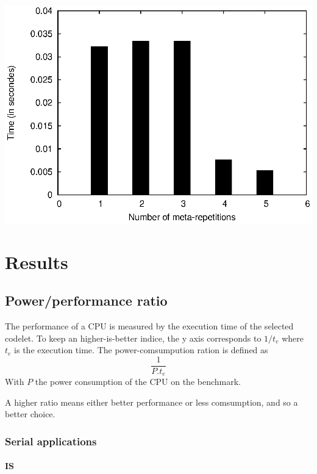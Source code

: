 \documentclass{article}
\newenvironment{Figure}
  {\par\medskip\noindent\minipage{\linewidth}}
  {\endminipage\par\bigskip\medskip}
\begin{document}
\begin{multicols}{2}
\begin{Figure}
\centering
\includegraphics[width=\linewidth]{nogood.eps}
\end{Figure}

\section{Results}
\label{results}

\subsection{Power/performance ratio}
The performance of a CPU is measured by the execution time of the selected codelet. To keep an higher-is-better indice, the y axis corresponds to $1/t_e$ where $t_e$ is the execution time.
The power-comsumpution ration is defined as 
\begin{equation}
\frac{1}{P.t_e}
\end{equation}
With $P$ the power consumption of the CPU on the benchmark.

A higher ratio means either better performance or less comsumption, and so a better choice.


\subsubsection{Serial applications}
\paragraph{IS}

\end{multicols}
\end{document}
